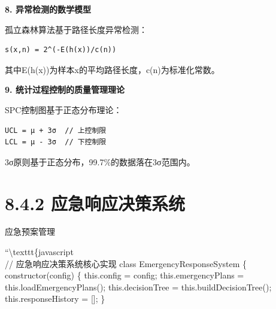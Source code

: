 \textbf{8. 异常检测的数学模型}

孤立森林算法基于路径长度异常检测：

\begin{lstlisting}
s(x,n) = 2^(-E(h(x))/c(n))
\end{lstlisting}

其中E(h(x))为样本x的平均路径长度，c(n)为标准化常数。

\textbf{9. 统计过程控制的质量管理理论}

SPC控制图基于正态分布理论：

\begin{lstlisting}
UCL = μ + 3σ  // 上控制限
LCL = μ - 3σ  // 下控制限
\end{lstlisting}

3σ原则基于正态分布，99.7\%的数据落在3σ范围内。

\section{8.4.2 应急响应决策系统}

 应急预案管理

``\textbackslash texttt\{javascript\\
// 应急响应决策系统核心实现 class EmergencyResponseSystem \{ constructor(config) \{ this.config = config; this.emergencyPlans = this.loadEmergencyPlans(); this.decisionTree = this.buildDecisionTree(); this.responseHistory = {[}{]}; \}

